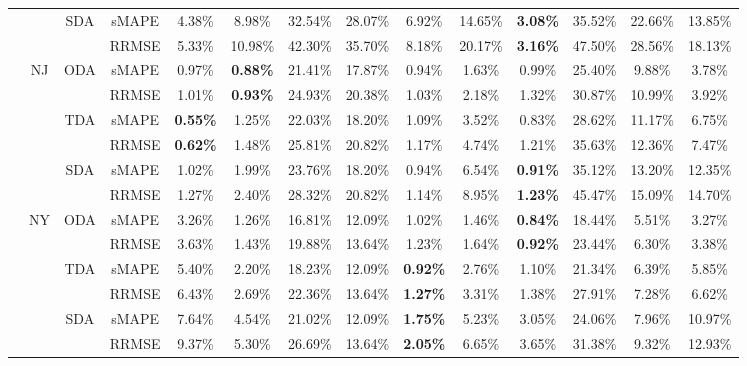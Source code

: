 {\begin{longtable}[htb!]{cccc|ccccc|ccccc}
 &  & {SDA} & sMAPE & 4.38\% & 8.98\% & 32.54\% & 28.07\% & 6.92\% & 14.65\% & \textbf{3.08\%} & 35.52\% & 22.66\% & 13.85\% \\
 &  &  & RRMSE & 5.33\% & 10.98\% & 42.30\% & 35.70\% & 8.18\% & 20.17\% & \textbf{3.16\%} & 47.50\% & 28.56\% & 18.13\% \\ \cline{2-14}
 & {NJ} & {ODA} & sMAPE & 0.97\% & \textbf{0.88\%} & 21.41\% & 17.87\% & 0.94\% & 1.63\% & 0.99\% & 25.40\% & 9.88\% & 3.78\% \\
 &  &  & RRMSE & 1.01\% & \textbf{0.93\%} & 24.93\% & 20.38\% & 1.03\% & 2.18\% & 1.32\% & 30.87\% & 10.99\% & 3.92\% \\
 &  & {TDA} & sMAPE & \textbf{0.55\%} & 1.25\% & 22.03\% & 18.20\% & 1.09\% & 3.52\% & 0.83\% & 28.62\% & 11.17\% & 6.75\% \\
 &  &  & RRMSE & \textbf{0.62\%} & 1.48\% & 25.81\% & 20.82\% & 1.17\% & 4.74\% & 1.21\% & 35.63\% & 12.36\% & 7.47\% \\
 &  & {SDA} & sMAPE & 1.02\% & 1.99\% & 23.76\% & 18.20\% & 0.94\% & 6.54\% & \textbf{0.91\%} & 35.12\% & 13.20\% & 12.35\% \\
 &  &  & RRMSE & 1.27\% & 2.40\% & 28.32\% & 20.82\% & 1.14\% & 8.95\% & \textbf{1.23\%} & 45.47\% & 15.09\% & 14.70\% \\ \cline{2-14}
 & {NY} & {ODA} & sMAPE & 3.26\% & 1.26\% & 16.81\% & 12.09\% & 1.02\% & 1.46\% & \textbf{0.84\%} & 18.44\% & 5.51\% & 3.27\% \\
 &  &  & RRMSE & 3.63\% & 1.43\% & 19.88\% & 13.64\% & 1.23\% & 1.64\% & \textbf{0.92\%} & 23.44\% & 6.30\% & 3.38\% \\
 &  & {TDA} & sMAPE & 5.40\% & 2.20\% & 18.23\% & 12.09\% & \textbf{0.92\%} & 2.76\% & 1.10\% & 21.34\% & 6.39\% & 5.85\% \\
 &  &  & RRMSE & 6.43\% & 2.69\% & 22.36\% & 13.64\% & \textbf{1.27\%} & 3.31\% & 1.38\% & 27.91\% & 7.28\% & 6.62\% \\
 &  & {SDA} & sMAPE & 7.64\% & 4.54\% & 21.02\% & 12.09\% & \textbf{1.75\%} & 5.23\% & 3.05\% & 24.06\% & 7.96\% & 10.97\% \\
 &  &  & RRMSE & 9.37\% & 5.30\% & 26.69\% & 13.64\% & \textbf{2.05\%} & 6.65\% & 3.65\% & 31.38\% & 9.32\% & 12.93\% \\ \hline
\end{longtable}%
}
